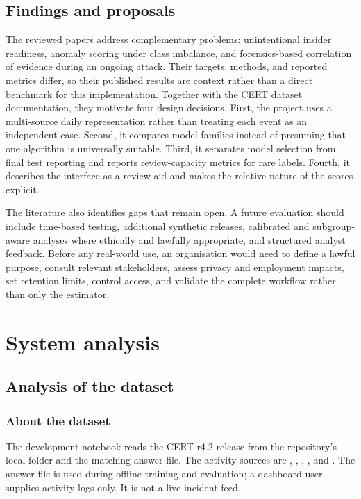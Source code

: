 \section{Findings and proposals}
The reviewed papers address complementary problems: unintentional
insider readiness, anomaly scoring under class imbalance, and
forensics-based correlation of evidence during an ongoing attack.
Their targets, methods, and reported metrics differ, so their
published results are context rather than a direct benchmark for this
implementation. Together with the CERT dataset documentation, they
motivate four design decisions. First, the project uses a multi-source
daily representation rather than treating each event as an independent
case. Second, it compares model families instead of presuming that one
algorithm is universally suitable. Third, it separates model selection
from final test reporting and reports review-capacity metrics for rare
labels. Fourth, it describes the interface as a review aid and makes
the relative nature of the scores explicit.

The literature also identifies gaps that remain open. A future
evaluation should include time-based testing, additional synthetic
releases, calibrated and subgroup-aware analyses where ethically and
lawfully appropriate, and structured analyst feedback. Before any
real-world use, an organisation would need to define a lawful purpose,
consult relevant stakeholders, assess privacy and employment impacts,
set retention limits, control access, and validate the complete
workflow rather than only the estimator.

\chapter{System analysis}
\label{chap:analysis}

\section{Analysis of the dataset}

\subsection{About the dataset}
The development notebook reads the CERT r4.2 release from the
repository's local  folder and the matching
 answer file. The activity sources are
, , ,
, and . The answer file is used during
offline training and evaluation; a dashboard user supplies activity
logs only. It is not a live incident feed.

